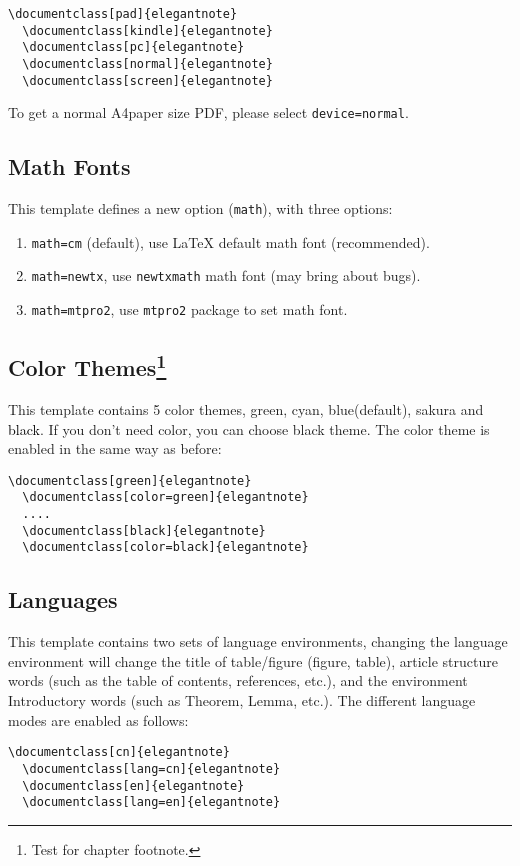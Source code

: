 \documentclass[en,normal,12pt,blue]{elegantnote}
\begin{document}
\begin{lstlisting}[frame=none]
  \documentclass[pad]{elegantnote}
  \documentclass[kindle]{elegantnote}
  \documentclass[pc]{elegantnote}
  \documentclass[normal]{elegantnote}
  \documentclass[screen]{elegantnote}
\end{lstlisting}

\begin{note}
To get a normal A4paper size PDF, please select \lstinline{device=normal}.
\end{note}

\subsection{Math Fonts}

This template defines a new option (\lstinline{math}), with three options:

\begin{enumerate}
  \item \lstinline{math=cm} (default), use \LaTeX{} default math font (recommended).
  \item \lstinline{math=newtx}, use \lstinline{newtxmath} math font (may bring about bugs).
  \item \lstinline{math=mtpro2}, use \lstinline{mtpro2} package to set math font.
\end{enumerate}


\subsection[Color Themes]{Color Themes\footnote{Test for chapter footnote.}}

This template contains 5 color themes, \textcolor{egreen}{green}, \textcolor{ecyan}{cyan}, \textcolor{eblue}{blue}(default), \textcolor{sakura}{sakura} and \textcolor{black}{black}. If you don't need color, you can choose black theme. The color theme is enabled in the same way as before:
\begin{lstlisting}[frame=none]
  \documentclass[green]{elegantnote}
  \documentclass[color=green]{elegantnote}
  ....
  \documentclass[black]{elegantnote}
  \documentclass[color=black]{elegantnote}
\end{lstlisting}


\subsection{Languages}

This template contains two sets of language environments, changing the language environment will change the title of table/figure (figure, table), article structure words (such as the table of contents, references, etc.), and the environment Introductory words (such as Theorem, Lemma, etc.). The different language modes are enabled as follows:
\begin{lstlisting}[frame=none]
  \documentclass[cn]{elegantnote}
  \documentclass[lang=cn]{elegantnote}
  \documentclass[en]{elegantnote}
  \documentclass[lang=en]{elegantnote}
\end{lstlisting}
\end{document}
